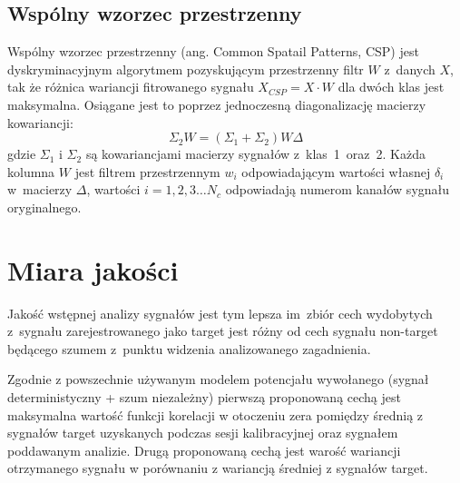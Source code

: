 \documentclass[licencjacka,openright]{pracamgr}
\begin{document}
\subsection{Wspólny wzorzec przestrzenny}
Wspólny wzorzec przestrzenny (ang. Common Spatail Patterns, CSP) jest dyskryminacyjnym algorytmem pozyskującym przestrzenny filtr $W$ z~danych $X$, tak że różnica wariancji fitrowanego sygnału \mbox{$X_{CSP} = X \cdot W$} dla dwóch klas jest maksymalna. Osiągane jest to poprzez jednoczesną diagonalizację macierzy kowariancji:
\begin{equation}
\Sigma _2 W = (\Sigma _1 + \Sigma _2 )W \Delta
\end{equation}
gdzie $\Sigma_1$ i $\Sigma_2$ są kowariancjami macierzy sygnałów z~klas~1~oraz~2. Każda kolumna $W$ jest filtrem przestrzennym $w_i$ odpowiadającym wartości własnej $\delta _i$ w~macierzy $\Delta$, wartości $i = 1,2,3 \ldots N_c$ odpowiadają numerom kanałów sygnału oryginalnego.%

\section{Miara jakości}
Jakość wstępnej analizy sygnałów jest tym lepsza im~zbiór cech wydobytych z~sygnału zarejestrowanego jako target jest różny od cech sygnału non-target będącego szumem z~punktu widzenia analizowanego zagadnienia.

Zgodnie z powszechnie używanym modelem potencjału wywołanego (sygnał deterministyczny + szum niezależny) pierwszą proponowaną cechą jest maksymalna wartość funkcji korelacji w otoczeniu zera pomiędzy średnią z sygnałów target uzyskanych podczas sesji kalibracyjnej oraz sygnałem poddawanym analizie.
Drugą proponowaną cechą jest warość wariancji otrzymanego sygnału w porównaniu z wariancją średniej z sygnałów target.
\end{document}
